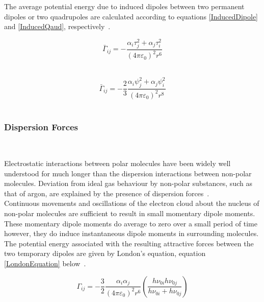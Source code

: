 The average potential energy due to induced dipoles between two permanent dipoles or two quadrupoles are calculated according to equations \ref{InducedDipole} and \ref{InducedQaud}, respectively~\cite{MolecularThermodynamicsOfFluidPhaseEquilibria}.\

\begin{equation}
\bar{\Gamma}_{ij} = -\frac{\alpha_{i}\tau_{j}^{2} + \alpha_{j}\tau_{i}^{2}}{\left(4\pi\varepsilon_{0}\right)^{2}r^{6}} \label{InducedDipole}
\end{equation}\

\begin{equation}
\bar{\Gamma}_{ij} = -\frac{2}{3}\frac{\alpha_{i}\psi_{j}^{2} + \alpha_{j}\psi_{i}^{2}}{\left(4\pi\varepsilon_{0}\right)^{2}r^{8}} \label{InducedQaud}
\end{equation}\

\subsubsection{Dispersion Forces}\

Electrostatic interactions between polar molecules have been widely well understood for much longer than the dispersion interactions between non-polar molecules. Deviation from ideal gas behaviour by non-polar substances, such as that of argon, are explained by the presence of dispersion forces~\cite{MolecularThermodynamicsOfFluidPhaseEquilibria}.\\

Continuous movements and oscillations of the electron cloud about the nucleus of non-polar molecules are sufficient to result in small momentary dipole moments. These momentary dipole moments do average to zero over a small period of time however, they do induce instantaneous dipole moments in surrounding molecules. The potential energy associated with the resulting attractive forces between the two temporary dipoles are given by London's equation, equation \ref{LondonEquation} below~\cite{MolecularThermodynamicsOfFluidPhaseEquilibria}.\ 

\begin{equation}
\Gamma_{ij} = -\frac{3}{2}\frac{\alpha_{i}\alpha_{j}}{\left(4\pi\varepsilon_{0}\right)^{2}r^{6}}\left(\frac{h\nu_{0i}h\nu_{0j}}{h\nu_{0i}+h\nu_{0j}}\right) \label{LondonEquation}
\end{equation}\

